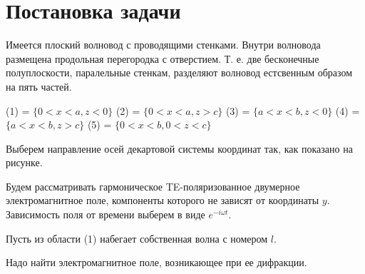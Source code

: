\chapter{Постановка задачи}

Имеется плоский волновод с проводящими стенками. Внутри волновода размещена продольная перегородка с отверстием. Т. е. две бесконечные полуплоскости, паралельные стенкам, разделяют волновод естсвенным образом на пять частей.

(1) = $\{0<x<a, z<0\}$
(2) = $\{0<x<a, z>c\}$
(3) = $\{a<x<b, z<0\}$
(4) = $\{a<x<b, z>c\}$
(5) = $\{0<x<b, 0<z<c\}$

Выберем направление осей декартовой системы координат так, как показано на рисунке.


Будем рассматривать гармоническое TE-поляризованное двумерное электромагнитное поле, компоненты которого не зависят от координаты $y$. Зависимость поля от времени выберем в виде $e^{-i\omega t}$.

Пусть из области (1) набегает собственная волна с номером $l$.

Надо найти электромагнитное поле, возникающее при ее дифракции.